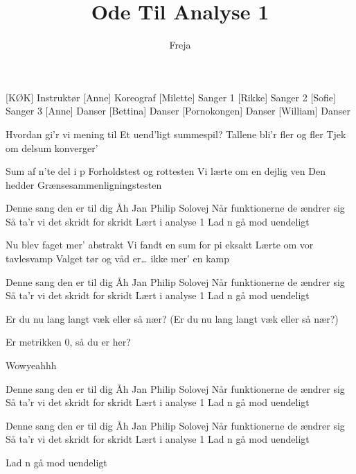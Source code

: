 \documentclass[a4paper,11pt]{article}
\title{Ode Til Analyse 1}
\author{Freja}
\begin{document}
\maketitle

\begin{roles}
[KØK] Instruktør
[Anne] Koreograf
[Milette] Sanger 1
[Rikke] Sanger 2
[Sofie] Sanger 3
[Anne] Danser
[Bettina] Danser
[Pornokongen] Danser
[William] Danser
\end{roles}

\begin{song}
 Hvordan gi’r vi mening til
Et uend’ligt summespil?
Tallene bli’r fler og fler
Tjek om delsum konverger’

 Sum af n’te del i p
Forholdstest og rottesten
Vi lærte om en dejlig ven
 Den hedder Grænsesammenligningstesten

 Denne sang den er til dig
Åh Jan Philip Solovej
Når funktionerne de ændrer sig
Så ta’r vi det skridt for skridt
Lært i analyse 1
Lad n gå mod uendeligt

 Nu blev faget mer’ abstrakt
Vi fandt en sum for pi eksakt
Lærte om vor tavlesvamp
 Valget tør og våd er… ikke mer’ en kamp 

 Denne sang den er til dig
Åh Jan Philip Solovej
Når funktionerne de ændrer sig
Så ta’r vi det skridt for skridt
Lært i analyse 1
Lad n gå mod uendeligt

 Er du nu lang langt væk eller så nær?
 (Er du nu lang langt væk eller så nær?)

 Er metrikken 0, så du er her?

 Wowyeahhh

 Denne sang den er til dig
Åh Jan Philip Solovej
Når funktionerne de ændrer sig
Så ta’r vi det skridt for skridt
Lært i analyse 1
Lad n gå mod uendeligt

 Denne sang den er til dig
Åh Jan Philip Solovej
Når funktionerne de ændrer sig
Så ta’r vi det skridt for skridt
Lært i analyse 1
Lad n gå mod uendeligt

 Lad n gå mod uendeligt

\end{song}
\end{document}
